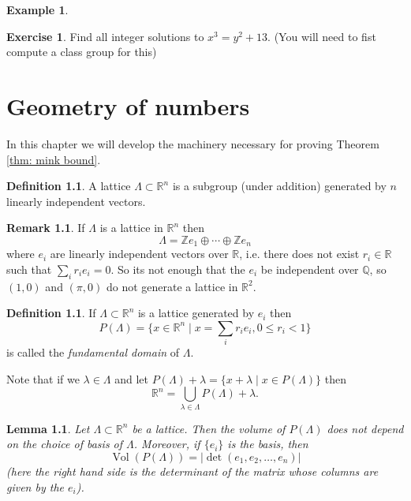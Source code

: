 \documentclass[11pt,a4paper]{report}
\theoremstyle{plain}
\newtheorem{lemma}[subsection]{Lemma}
\theoremstyle{definition}
\newtheorem{definition}[subsection]{Definition}
\newtheorem{exmp}[subsection]{Example}
\theoremstyle{definition}
\newtheorem{rmrk}[subsection]{Remark}
\newtheorem{question}[subsection]{Exercise}
\newcommand{\ZZ}{\mathbb{Z}}
\newcommand{\RR}{\mathbb{R}}
\def\QQ{\mathbb{Q}}
\def \lam {\lambda}
\DeclareMathOperator{\Vol}{Vol}
\begin{document}
\begin{exmp}
		
		
		
		
	\end{exmp}
	
	
	
	\begin{question}
		Find all integer solutions to $x^3=y^2+13$. (You will need to fist compute a class group for this)
	\end{question}
	
	
	
	
	
	\chapter{Geometry of numbers}
	
	In this chapter we will develop the machinery necessary for proving Theorem \ref{thm: mink bound}.
	
	\begin{definition}
		A lattice $\Lambda \subset \RR^n$ is a subgroup (under addition) generated by $n$ linearly independent vectors.
	\end{definition}
	
	\begin{rmrk}
		If $\Lambda$ is a lattice in $\RR^n$ then \[\Lambda= \ZZ e_1 \oplus \cdots \oplus \ZZ e_n\] where $e_i$ are linearly independent vectors over $\RR$, i.e. there does not exist $r_i \in \RR$ such that $\sum_i r_ie_i =0$.
		So its not enough that the $e_i$ be independent over $\QQ$, so $(1,0)$ and $(\pi,0)$ do not generate a lattice in $\RR^2$.
	\end{rmrk}
	
	\begin{definition}
		If $\Lambda \subset \RR^n$ is a lattice generated by $e_i$ then \[P(\Lambda)=\{x \in \RR^n \mid x=\sum_i r_ie_i, 0 \leq r_i < 1 \}\] is called the \textit{fundamental domain} of $\Lambda$.
	\end{definition}
	
	Note that if we $\lam \in \Lambda$  and let $P(\Lambda)+\lambda=\{x+ \lam \mid x \in P(\Lambda)\}$ then \[\RR^n= \bigcup_{\lam \in \Lambda} P(\Lambda) +\lam. \]
	
	\begin{lemma}
		Let $\Lambda \subset \RR^n$ be a lattice. Then the volume of $P(\Lambda)$ does not depend on the choice of basis of $\Lambda$. Moreover, if $\{e_i\}$ is the basis, then \[\Vol(P(\Lambda))=|\det(e_1,e_2,\dots,e_n)| \] (here the right hand side is the determinant of the matrix whose columns are given by the $e_i$).
	\end{lemma}
	
\end{document}
